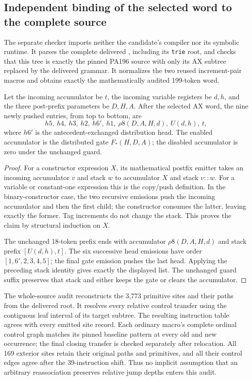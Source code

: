 \subsection{Independent binding of the selected word to the complete source}
\label{sec:independent-source-binding}

The separate checker  imports neither
the candidate's compiler nor its symbolic runtime. It parses the
complete delivered , including its \texttt{trie}
root, and checks that this tree is exactly the pinned PA196 source
with only its AX subtree replaced by the delivered grammar. It
normalizes the two reused increment-pair macros and obtains exactly
the mathematically audited 199-token word.

\begin{lemma}
Let the incoming accumulator be $t$, the incoming variable registers
be $d,h$, and the three post-prefix parameters be $D,H,A$.
After the selected AX word, the nine newly pushed entries, from top
to bottom, are
\[
 h5,\ h4,\ h3,\ h2,\ h6',\ h1,\
 \rho8(D,A,H,d),\ U(d,h),\ t,
\]
where $h6'$ is the antecedent-exchanged distribution head.
The enabled accumulator is the distributed gate $F_*(H,D,A)$;
the disabled accumulator is zero under the unchanged guard.
\end{lemma}
\begin{proof}
For a constructor expression $X$, its mathematical postfix emitter
takes an incoming accumulator $v$ and stack $w$ to accumulator $X$
and stack $v::w$. For a variable or constant-one expression this is
the copy/push definition. In the binary-constructor case, the two
recursive emissions push the incoming accumulator and then the
first child; the constructor consumes the latter, leaving exactly
the former. Tag increments do not change the stack. This proves
the claim by structural induction on $X$.

The unchanged 18-token prefix ends with accumulator
$\rho8(D,A,H,d)$ and stack prefix $[U(d,h),t]$. The six successive
head emissions have order $[1,6',2,3,4,5]$; the final gate emission
pushes the last head. Applying the preceding stack identity gives
exactly the displayed list. The unchanged guard suffix preserves
that stack and either keeps the gate or clears the accumulator.
\end{proof}

The whole-source audit reconstructs the 3,773 primitive sites and
their paths from the delivered root. It resolves every relative
control transfer using the contiguous leaf interval of its target
subtree. The resulting instruction table agrees with every emitted
site record. Each ordinary macro's complete ordinal control graph
matches its pinned baseline pattern at every old and new occurrence;
the final closing transfer is checked separately after relocation.
All 169 exterior sites retain their original paths and primitives,
and all their control edges agree after the 39-instruction shift.
Thus no implicit assumption that an arbitrary reassociation
preserves relative jump depths enters this audit.

